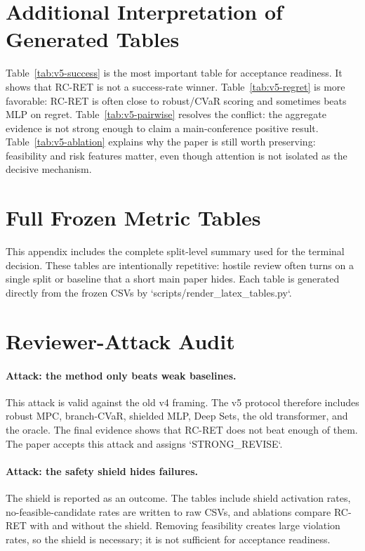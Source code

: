 \documentclass{article}
\newcommand{\method}{RC-RET}
\begin{document}
\section{Additional Interpretation of Generated Tables}

Table~\ref{tab:v5-success} is the most important table for acceptance readiness.  It shows that \method{} is not a success-rate winner.  Table~\ref{tab:v5-regret} is more favorable: \method{} is often close to robust/CVaR scoring and sometimes beats MLP on regret.  Table~\ref{tab:v5-pairwise} resolves the conflict: the aggregate evidence is not strong enough to claim a main-conference positive result.  Table~\ref{tab:v5-ablation} explains why the paper is still worth preserving: feasibility and risk features matter, even though attention is not isolated as the decisive mechanism.

\clearpage
\section{Full Frozen Metric Tables}

This appendix includes the complete split-level summary used for the terminal decision.  These tables are intentionally repetitive: hostile review often turns on a single split or baseline that a short main paper hides.  Each table is generated directly from the frozen CSVs by `scripts/render\_latex\_tables.py`.



\clearpage
\section{Reviewer-Attack Audit}

\paragraph{Attack: the method only beats weak baselines.}
This attack is valid against the old v4 framing.  The v5 protocol therefore includes robust MPC, branch-CVaR, shielded MLP, Deep Sets, the old transformer, and the oracle.  The final evidence shows that \method{} does not beat enough of them.  The paper accepts this attack and assigns `STRONG\_REVISE`.

\paragraph{Attack: the safety shield hides failures.}
The shield is reported as an outcome.  The tables include shield activation rates, no-feasible-candidate rates are written to raw CSVs, and ablations compare \method{} with and without the shield.  Removing feasibility creates large violation rates, so the shield is necessary; it is not sufficient for acceptance readiness.
\end{document}
